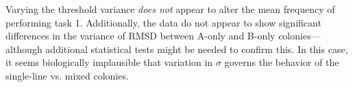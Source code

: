 \documentclass[11pt]{article}
\begin{document}
\begin{appendices}
Varying the threshold variance \textit{does not} appear to alter the mean frequency of performing task 1. {\color{blue}Additionally, the data do not appear to show significant differences in the variance of RMSD between A-only and B-only colonies---although additional statistical tests might be needed to confirm this.}
In this case, it seems biologically implausible that variation in $\sigma$ governs the behavior of the single-line vs. mixed colonies.


\end{appendices}
\end{document}
